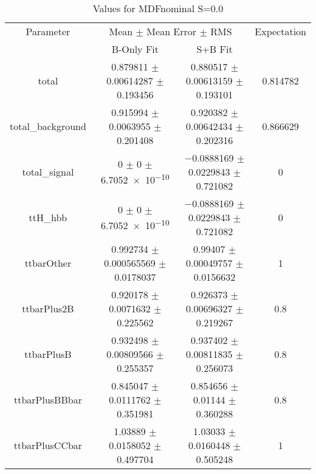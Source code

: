 \begin{table}
\centering
\caption{Values for MDFnominal S=0.0}
\begin{tabular}{cccc}
\toprule
Parameter & \multicolumn{2}{c}{Mean $\pm$ Mean Error $\pm$ RMS} & Expectation\\
 & B-Only Fit & S+B Fit & \\
\midrule
total & \num{0.879811} $\pm$ \num{0.00614287} $\pm$ \num{0.193456} & \num{0.880517} $\pm$ \num{0.00613159} $\pm$ \num{0.193101} & \num{0.814782}\\
total\_background & \num{0.915994} $\pm$ \num{0.0063955} $\pm$ \num{0.201408} & \num{0.920382} $\pm$ \num{0.00642434} $\pm$ \num{0.202316} & \num{0.866629}\\
total\_signal & \num{0} $\pm$ \num{0} $\pm$ \num{6.7052e-10} & \num{-0.0888169} $\pm$ \num{0.0229843} $\pm$ \num{0.721082} & \num{0}\\
ttH\_hbb & \num{0} $\pm$ \num{0} $\pm$ \num{6.7052e-10} & \num{-0.0888169} $\pm$ \num{0.0229843} $\pm$ \num{0.721082} & \num{0}\\
ttbarOther & \num{0.992734} $\pm$ \num{0.000565569} $\pm$ \num{0.0178037} & \num{0.99407} $\pm$ \num{0.00049757} $\pm$ \num{0.0156632} & \num{1}\\
ttbarPlus2B & \num{0.920178} $\pm$ \num{0.0071632} $\pm$ \num{0.225562} & \num{0.926373} $\pm$ \num{0.00696327} $\pm$ \num{0.219267} & \num{0.8}\\
ttbarPlusB & \num{0.932498} $\pm$ \num{0.00809566} $\pm$ \num{0.255357} & \num{0.937402} $\pm$ \num{0.00811835} $\pm$ \num{0.256073} & \num{0.8}\\
ttbarPlusBBbar & \num{0.845047} $\pm$ \num{0.0111762} $\pm$ \num{0.351981} & \num{0.854656} $\pm$ \num{0.01144} $\pm$ \num{0.360288} & \num{0.8}\\
ttbarPlusCCbar & \num{1.03889} $\pm$ \num{0.0158052} $\pm$ \num{0.497704} & \num{1.03033} $\pm$ \num{0.0160448} $\pm$ \num{0.505248} & \num{1}\\
\bottomrule
\end{tabular}
\end{table}